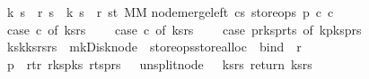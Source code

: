 \begin{isabellebody}
\ \ {\isacharparenleft}{\isacharprime}k\ s\ {\isacharasterisk}\ {\isacharprime}r\ s{\isacharparenright}\ {\isasymRightarrow}\ {\isacharparenleft}{\isacharprime}k\ s\ {\isacharasterisk}\ {\isacharprime}r\ s{\isacharcomma}{\isacharprime}t{\isacharparenright}\ MM{\isachardoublequoteclose}\isanewline
{}\isanewline
{\isachardoublequoteopen}node{\isacharunderscore}merge{\isacharunderscore}left\ cs\ store{\isacharunderscore}ops\ p\ c{}\ c{}\ {\isacharequal}\ {\isacharparenleft}\isanewline
\ \ case\ c{}\ of\ {\isacharparenleft}ks{}{\isacharcomma}rs{}{\isacharparenright}\ {\isasymRightarrow}\ \isanewline
\ \ case\ c{}\ of\ {\isacharparenleft}ks{}{\isacharcomma}rs{}{\isacharparenright}\ {\isasymRightarrow}\ \isanewline
\ \ case\ {\isacharparenleft}p{\isacharbar}{\isachargreater}r{\isacharunderscore}ks{}{\isacharcomma}p{\isacharbar}{\isachargreater}r{\isacharunderscore}ts{}{\isacharparenright}\ of\ {\isacharparenleft}k{}{\isacharhash}p{\isacharunderscore}ks{}{\isacharcomma}{\isacharunderscore}{\isacharhash}p{\isacharunderscore}rs{}{\isacharparenright}\ {\isasymRightarrow}\ \ \ \isanewline
\ \ {\isacharparenleft}ks{}{\isacharat}{\isacharbrackleft}k{}{\isacharbrackright}{\isacharat}ks{}{\isacharcomma}rs{}{\isacharat}rs{}{\isacharparenright}\ {\isacharbar}{\isachargreater}\ mk{\isacharunderscore}Disk{\isacharunderscore}node\ {\isacharbar}{\isachargreater}\ {\isacharparenleft}store{\isacharunderscore}ops{\isacharbar}{\isachargreater}store{\isacharunderscore}alloc{\isacharparenright}\ {\isacharbar}{\isachargreater}\ bind\ {\isacharparenleft}{\isacharpercent}\ r{}{\isachardot}\ \isanewline
\ \ p\ {\isasymlparr}\ r{\isacharunderscore}t{\isacharcolon}{\isacharequal}r{}{\isacharcomma}\ r{\isacharunderscore}ks{}{\isacharcolon}{\isacharequal}p{\isacharunderscore}ks{}{\isacharcomma}\ r{\isacharunderscore}ts{}{\isacharcolon}{\isacharequal}p{\isacharunderscore}rs{}\ {\isasymrparr}\ {\isacharbar}{\isachargreater}\ unsplit{\isacharunderscore}node\ {\isacharbar}{\isachargreater}\ {\isacharparenleft}{\isacharpercent}\ {\isacharparenleft}ks{\isacharcomma}rs{\isacharparenright}{\isachardot}\ return\ {\isacharparenleft}ks{\isacharcomma}rs{\isacharparenright}{\isacharparenright}{\isacharparenright}{\isacharparenright}{\isachardoublequoteclose}\isanewline
\isanewline
\isanewline
\isanewline

\end{isabellebody}
